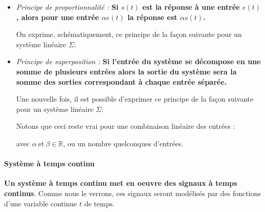 \begin{itemize}
    \item \emph{Principe de proportionnalité :}
          \textbf{Si $s(t)$ est la réponse à une entrée $e(t)$, alors 
          pour une entrée $\alpha e(t)$ la réponse est $\alpha s(t)$.}
        
    On exprime, schématiquement, ce principe de la façon suivante pour 
    un système linéaire $\Sigma$:
    \begin{center}
    
    \end{center}

    \item \emph{Principe de superposition :}
     \textbf{Si l'entrée du système se décompose en une somme 
        de plusieurs entrées alors la sortie du système sera la somme des 
        sorties correspondant à chaque entrée séparée.}

    Une nouvelle fois, il est possible d'exprimer ce principe de la façon 
    suivante pour un système linéaire $\Sigma$:
    \begin{center}
    
    \end{center}

    Notons que ceci reste vrai pour une combinaison linéaire des entrées :
    \begin{center}
    
    \end{center}
    avec $\alpha\ \text{et}\ \beta\in\mathbb{R}$, ou un nombre quelconques 
    d'entrées.
\end{itemize}
\paragraph{Système à temps continu}
\textbf{Un système à temps continu met en oeuvre des signaux 
à temps continus}. Comme nous le verrons, ces signaux seront
modélisés par des fonctions d'une variable continue $t$ de temps.


